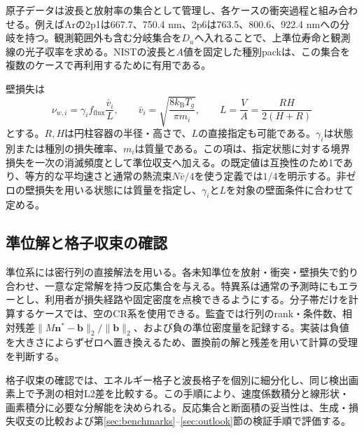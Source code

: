 原子データは波長と放射率の集合として管理し、各ケースの衝突過程と組み合わせる。例えばArの2p1は667.7、750.4 nm、2p6は763.5、800.6、922.4 nmへの分岐を持つ。観測範囲外も含む分岐集合を$D_u$へ入れることで、上準位寿命と観測線の光子収率を求める。NISTの波長と$A$値を固定した種別packは、この集合を複数のケースで再利用するために有用である\cite{nist}。

壁損失は
\begin{equation}
\nu_{w,i}=\gamma_i f_{\mathrm{flux}}\frac{\bar v_i}{L},\qquad
\bar v_i=\sqrt{\frac{8k_{\mathrm B}T_g}{\pi m_i}},\qquad
L=\frac VA=\frac{RH}{2(H+R)}
\label{eq:wall}
\end{equation}
とする。$R,H$は円柱容器の半径・高さで、$L$の直接指定も可能である。$\gamma_i$は状態別または種別の損失確率、$m_i$は質量である。この項は、指定状態に対する境界損失を一次の消滅頻度として準位収支へ加える。の既定値は互換性のため1であり、等方的な平均速さと通常の熱流束$N\bar v/4$を使う定義では$1/4$を明示する。非ゼロの壁損失を用いる状態には質量を指定し、$\gamma_i$と$L$を対象の壁面条件に合わせて定める。

\subsection{準位解と格子収束の確認}
準位系には密行列の直接解法を用いる。各未知準位を放射・衝突・壁損失で釣り合わせ、一意な定常解を持つ反応集合を与える。特異系は通常の予測時にもエラーとし、利用者が損失経路や固定密度を点検できるようにする。分子帯だけを計算するケースでは、空のCR系を使用できる。監査では行列のrank・条件数、相対残差$\|M\boldsymbol n^*-\boldsymbol b\|_2/\|\boldsymbol b\|_2$、および負の準位密度量を記録する。実装は負値を大きさによらずゼロへ置き換えるため、置換前の解と残差を用いて計算の受理を判断する。

格子収束の確認では、エネルギー格子と波長格子を個別に細分化し、同じ検出画素上で予測の相対L2差を比較する。この手順により、速度係数積分と線形状・画素積分に必要な分解能を決められる。反応集合と断面積の妥当性は、生成・損失収支の比較および第\ref{sec:benchmarks}--\ref{sec:outlook}節の検証手順で評価する。
